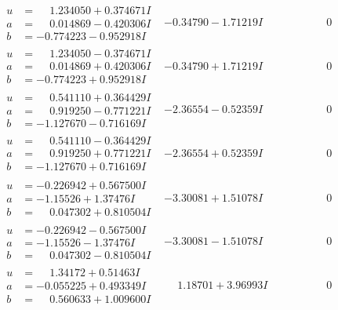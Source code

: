 \documentclass[1p]{elsarticle_modified}
\theoremstyle{definition}
\begin{document}
$$\begin{array}{c|c|c}
\begin{aligned}
u &= \phantom{-}1.234050 + 0.374671 I \\
a &= \phantom{-}0.014869 - 0.420306 I \\
b &= -0.774223 - 0.952918 I\end{aligned}
 & -0.34790 - 1.71219 I & \phantom{-0.000000 } 0 \\ \hline\begin{aligned}
u &= \phantom{-}1.234050 - 0.374671 I \\
a &= \phantom{-}0.014869 + 0.420306 I \\
b &= -0.774223 + 0.952918 I\end{aligned}
 & -0.34790 + 1.71219 I & \phantom{-0.000000 } 0 \\ \hline\begin{aligned}
u &= \phantom{-}0.541110 + 0.364429 I \\
a &= \phantom{-}0.919250 - 0.771221 I \\
b &= -1.127670 - 0.716169 I\end{aligned}
 & -2.36554 - 0.52359 I & \phantom{-0.000000 } 0 \\ \hline\begin{aligned}
u &= \phantom{-}0.541110 - 0.364429 I \\
a &= \phantom{-}0.919250 + 0.771221 I \\
b &= -1.127670 + 0.716169 I\end{aligned}
 & -2.36554 + 0.52359 I & \phantom{-0.000000 } 0 \\ \hline\begin{aligned}
u &= -0.226942 + 0.567500 I \\
a &= -1.15526 + 1.37476 I \\
b &= \phantom{-}0.047302 + 0.810504 I\end{aligned}
 & -3.30081 + 1.51078 I & \phantom{-0.000000 } 0 \\ \hline\begin{aligned}
u &= -0.226942 - 0.567500 I \\
a &= -1.15526 - 1.37476 I \\
b &= \phantom{-}0.047302 - 0.810504 I\end{aligned}
 & -3.30081 - 1.51078 I & \phantom{-0.000000 } 0 \\ \hline\begin{aligned}
u &= \phantom{-}1.34172 + 0.51463 I \\
a &= -0.055225 + 0.493349 I \\
b &= \phantom{-}0.560633 + 1.009600 I\end{aligned}
 & \phantom{-}1.18701 + 3.96993 I & \phantom{-0.000000 } 0 \\ \hline\begin{aligned}

\end{aligned}
\end{array}$$
\end{document}
